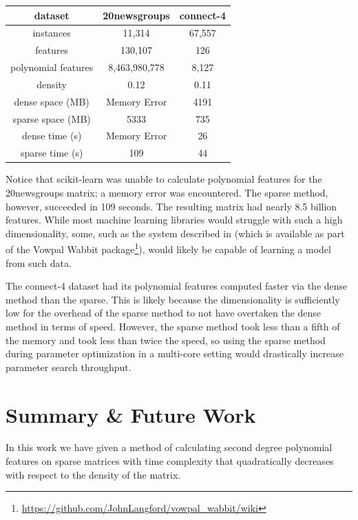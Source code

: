 \documentclass[11pt,twocolumn]{article}
\begin{document}
\begin{center}
    \begin{tabular}{c | c | c} \label{table:results}
        dataset             & 20newsgroups  & connect-4 \\ \hline
        instances           & 11,314        & 67,557    \\ \hline
        features            & 130,107       & 126       \\ \hline
        polynomial features & 8,463,980,778 & 8,127     \\ \hline
        density             & 0.12          & 0.11      \\ \hline
        dense space (MB)    & Memory Error  & 4191      \\ \hline
        sparse space (MB)   & 5333          & 735       \\ \hline
        dense time (s)      & Memory Error  & 26        \\ \hline
        sparse time (s)     & 109           & 44        \\ \hline
    \end{tabular}
\end{center}

Notice that scikit-learn was unable to calculate polynomial features for the 20newsgroups 
matrix; a memory error was encountered. The sparse method, however, succeeded in 109 seconds.
The resulting matrix had nearly 8.5 billion features. While most machine learning libraries would
struggle with such a high dimensionality, some, such as the system described in \cite{agarwal2014reliable} (which is 
available as part of the Vowpal Wabbit package\footnote{\url{https://github.com/JohnLangford/vowpal_wabbit/wiki}}), would likely be capable
of learning a model from such data.

The connect-4 dataset had its polynomial features computed faster via the dense method than the sparse. This
is likely because the dimensionality is sufficiently low for the overhead of the sparse method
to not have overtaken the dense method in terms of speed. However, the sparse method took less than
a fifth of the memory and took less than twice the speed, so using the sparse method during parameter 
optimization in a multi-core setting would drastically increase parameter search throughput.

\section{Summary \& Future Work}
In this work we have given a method of calculating second degree polynomial features on sparse matrices
with time complexity that quadratically decreases with respect to the density of the matrix.
\end{document}
